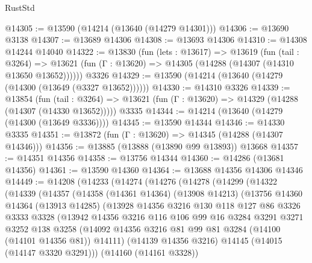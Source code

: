 \begin{lexlean}{RustStd}
\begin{coremodule}
@14305 := @13590 (@14214 (@13640 (@14279 @14301)))
@14306 := @13690 @3138
@14307 := @13689 @14306
@14308 := @13693 @14306
@14310 := @14308 @14244 @14040
@14322 := @13830
    (fun (lets : @13617) =>
    @13619
      (fun (tail : @3264) =>
      @13621 (fun (Γ : @13620) => @14305 (@14288 (@14307 (@14310 @13650 @13652))))))
    @3326
@14329 := @13590 (@14214 (@13640 (@14279 (@14300 (@13649 (@3327 @13652))))))
@14330 := @14310 @3326
@14339 := @13854
    (fun (tail : @3264) => @13621 (fun (Γ : @13620) => @14329 (@14288 (@14307 (@14330 @13652)))))
    @3335
@14344 := @14214 (@13640 (@14279 (@14300 (@13649 @3336))))
@14345 := @13590 @14344
@14346 := @14330 @3335
@14351 := @13872 (fun (Γ : @13620) => @14345 (@14288 (@14307 @14346)))
@14356 := @13885 (@13888 (@13890 @99 @13893)) @13668
@14357 := @14351 @14356
@14358 := @13756 @14344
@14360 := @14286 (@13681 @14356)
@14361 := @13590 @14360
@14364 := @13688 @14356 @14306 @14346
@14449 := @14208
    (@14233
      (@14274
        (@14276
          (@14278
            (@14299
              (@14322
                (@14339
                  (@14357
                    (@14358
                      (@14361 @14364)
                      (@13908 @14213)
                      (@13756
                        @14360
                        @14364
                        (@13913 @14285)
                        (@13928
                          @14356
                          @3216
                          @130
                          @118
                          @127
                          @86
                          @3326
                          @3333
                          @3328
                          (@13942
                            @14356
                            @3216
                            @116
                            @106
                            @99
                            @16
                            @3284
                            @3291
                            @3271
                            @3252
                            @138
                            @3258
                            (@14092
                              @14356
                              @3216
                              @81
                              @99
                              @81
                              @3284
                              (@14100 (@14101 @14356 @81))
                              @14111)
                            (@14139 @14356 @3216)
                            @14145
                            (@14015 (@14147 @3320 @3291)))
                          (@14160 (@14161 @3328))

\end{coremodule}
\end{lexlean}
